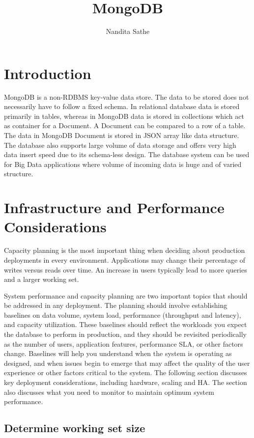 \documentclass[9pt,twocolumn,twoside]{../../styles/osajnl}
\title{MongoDB}
\author[1,*]{Nandita Sathe}
\affil[1]{School of Informatics and Computing, Bloomington, IN 47408, U.S.A.}
\affil[*]{Corresponding author: nsathe@iu.edu}
\begin{document}
\maketitle

\section{Introduction}

MongoDB is a non-RDBMS key-value data store. The data to be stored does not necessarily have to follow a fixed schema. In relational database data is stored primarily in tables, whereas in MongoDB data is stored in collections which act as container for a Document. A Document can be compared to a row of a table. The data in MongoDB Document is stored in JSON array like data structure. The database also supports large volume of data storage and offers very high data insert speed due to its schema-less design. The database system can be used for Big Data applications where volume of incoming data is huge and of varied structure.

\section{Infrastructure and Performance Considerations}

Capacity planning is the most important thing when deciding about production deployments in every environment. Applications may change their percentage of writes versus reads over time. An increase in users typically lead to more queries and a larger working set.

System performance and capacity planning are two important topics that should be addressed in any deployment. The planning should involve establishing baselines on data volume, system load, performance (throughput and latency), and capacity utilization. These baselines should reflect the workloads you expect the database to perform in production, and they should be revisited periodically as the number of users, application features, performance SLA, or other factors change. Baselines will help you understand when the system is operating as designed, and when issues begin to emerge that may affect the quality of the user experience or other factors critical to the system. The following section discusses key deployment considerations, including hardware, scaling and HA. The section also discusses what you need to monitor to maintain optimum system performance.

\subsection{Determine working set size}
\end{document}
